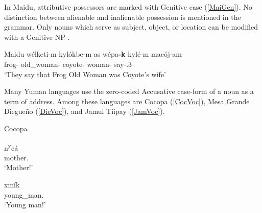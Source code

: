 

In Maidu, attributive possessors are marked with {Genitive} case (\ref{MaiGen}).  
No distinction between alienable and inalienable possession is mentioned in the grammar. 
Only nouns which serve as subject, object, or location can be modified with a {Genitive} NP \citep[30--31]{Shipley:1964}.

\begin{exe}\ex \label{MaiGen} {Maidu} \citep[31]{Shipley:1964}\nopagebreak[4]
\gll w\'elk\textraiseglotstop et\textraiseglotstop i-m kyl\'okbe-m {\textglotstop}as w\'epa\textbf{-k} kyl\'e-m mac\textraiseglotstop \'oj-{\textglotstop}am\\
frog-\nom{} old\_woman-\nom{} \emphat{} coyote-\gen{} woman-\nom{} say-\pstpunc{}.3\\
`They say that Frog Old Woman was Coyote's wife'
\end{exe}


Many Yuman languages use the zero-coded Accusative case-form of a noun as a term of address.
Among these languages are Cocopa (\ref{CocVoc}),  Mesa Grande Diegue\~no (\ref{DieVoc}), and Jamul Tiipay (\ref{JamVoc}). 

\begin{exe}\ex\label{CocVoc} {Cocopa} \citep[179]{Crawford:1966}\nopagebreak[4]
\begin{xlist}
\ex\gll n\textsuperscript{y}c\'a\\
mother.\acc{}\\
`Mother!'

\ex\gll xm\'ik\\
young\_man.\acc{}\\
`Young man!'
\end{xlist}
\end{exe}

